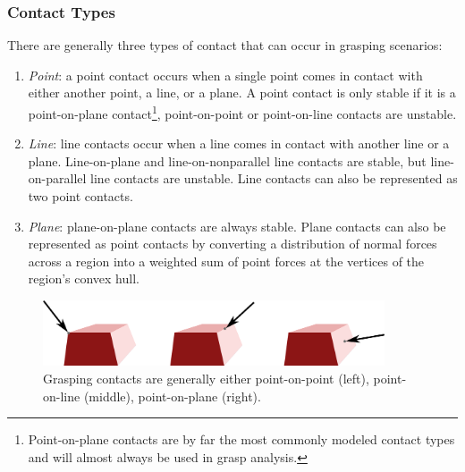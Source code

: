 \subsubsection{Contact Types}
There are generally three types of contact that can occur in grasping scenarios:
\begin{enumerate}
    \item \textit{Point}: a point contact occurs when a single point comes in contact with either another point, a line, or a plane. A point contact is only stable if it is a point-on-plane contact\footnote{Point-on-plane contacts are by far the most commonly modeled contact types and will almost always be used in grasp analysis.}, point-on-point or point-on-line contacts are unstable.
    \item \textit{Line}: line contacts occur when a line comes in contact with another line or a plane. Line-on-plane and line-on-nonparallel line contacts are stable, but line-on-parallel line contacts are unstable. Line contacts can also be represented as two point contacts.
    \item \textit{Plane}: plane-on-plane contacts are always stable. Plane contacts can also be represented as point contacts by converting a distribution of normal forces across a region into a weighted sum of point forces at the vertices of the region's convex hull.
\end{enumerate}
\begin{figure}[ht]
\begin{center}
\includegraphics[width=0.9\textwidth]{tex/figs/ch26_figs/contacts.png}
\caption{Grasping contacts are generally either point-on-point (left), point-on-line (middle), point-on-plane (right).}
\label{fig:contacts}
\end{center}
\end{figure}

